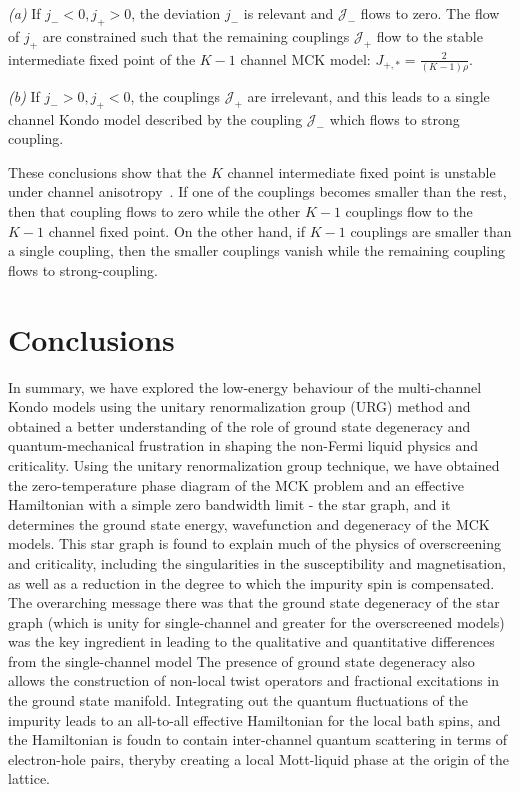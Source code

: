\documentclass[reprint,prb,superscriptaddress]{revtex4-2}
\begin{document}
\par\textit{(a)} If \(j_-<0,j_+>0\), the deviation \(j_-\) is relevant and \(\mathcal{J}_-\) flows to zero. The flow of \(j_+\) are constrained such that the remaining couplings \(\mathcal{J}_+\) flow to the stable intermediate fixed point of the \(K-1\) channel MCK model: \(J_{+,*} = \frac{2}{(K-1)\rho}\).
\par\textit{(b)} If \(j_- > 0, j_+<0\), the couplings \(\mathcal{J}_+\) are irrelevant, and this leads to a single channel Kondo model described by the coupling \(\mathcal{J}_-\) which flows to strong coupling.

These conclusions show that the \(K\) channel intermediate fixed point is unstable under channel anisotropy~\cite{Noz_blandin_1980,andrei_jerez_1995,affleck_pang_cox_1992,zarand_2000}. If one of the couplings becomes smaller than the rest, then that coupling flows to zero while the other \(K-1\) couplings flow to the \(K-1\) channel fixed point. On the other hand, if \(K-1\) couplings are smaller than a single coupling, then the smaller couplings vanish while the remaining coupling flows to strong-coupling.


\section{Conclusions}
\par
In summary, we have explored the low-energy behaviour of the multi-channel Kondo models using the unitary renormalization group (URG) method and obtained a better understanding of the role of ground state degeneracy and quantum-mechanical frustration in shaping the non-Fermi liquid physics and criticality.
Using the unitary renormalization group technique, we have obtained the zero-temperature phase diagram of the MCK problem and an effective Hamiltonian with a simple zero bandwidth limit - the star graph, and it determines the ground state energy, wavefunction and degeneracy of the MCK models.
This star graph is found to explain much of the physics of overscreening and criticality, including the singularities in the susceptibility and magnetisation, as well as a reduction in the degree to which the impurity spin is compensated.
The overarching message there was that the ground state degeneracy of the star graph (which is unity for single-channel and greater for the overscreened models) was the key ingredient in leading to the qualitative and quantitative differences from the single-channel model
The presence of ground state degeneracy also allows the construction of non-local twist operators and fractional excitations in the ground state manifold.
Integrating out the quantum fluctuations of the impurity leads to an all-to-all effective Hamiltonian for the local bath spins, and the Hamiltonian is foudn to contain inter-channel quantum scattering in terms of electron-hole pairs, theryby creating a local Mott-liquid phase at the origin of the lattice.
\end{document}
